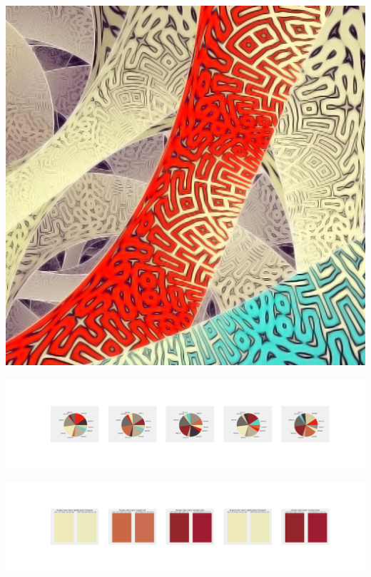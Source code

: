 \documentclass[11pt]{article}
\begin{document}
\begin{landscape}
    \begin{center}
    \includegraphics[width=\textwidth]{./nbimg/file (380).jpg}
    \end{center}

    \begin{center}
    \includegraphics[width=250mm]{./nbimg/pie-312.jpg}
    \end{center}

    \begin{center}
    \includegraphics[width=250mm]{./nbimg/peak-312.jpg}
    \end{center}
    


\end{landscape}
\end{document}
